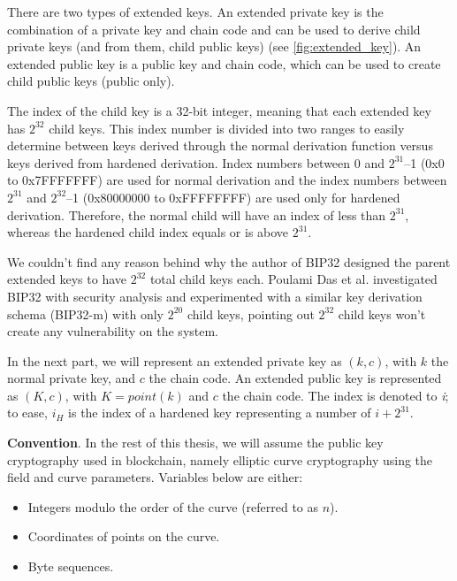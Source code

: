 There are two types of extended keys. An extended private key is the combination of a private key and chain code and can be used to derive child private keys (and from them, child public keys) (see \autoref{fig:extended_key}). An extended public key is a public key and chain code, which can be used to create child public keys (public only).

The index of the child key is a 32-bit integer, meaning that each extended key has $2^{32}$ child keys. This index number is divided into two ranges to easily determine between keys derived through the normal derivation function versus keys derived from hardened derivation. Index numbers between 0 and $2^{31}$–1 (0x0 to 0x7FFFFFFF) are used for normal derivation and the index numbers between $2^{31}$ and $2^{32}$–1 (0x80000000 to 0xFFFFFFFF) are used only for hardened derivation. Therefore, the normal child will have an index of less than $2^{31}$, whereas the hardened child index equals or is above  $2^{31}$.

We couldn’t find any reason behind why the author of BIP32 designed the parent extended keys to have $2^{32}$ total child keys each. Poulami Das et al. \cite{DBLP:conf/ccs/0003EFL021} investigated BIP32 with security analysis and experimented with a similar key derivation schema (BIP32-m) with only $2^{20}$ child keys, pointing out $2^{32}$ child keys won’t create any vulnerability on the system.

In the next part, we will represent an extended private key as $(k, c)$, with $k$ the normal private key, and $c$ the chain code. An extended public key is represented as $(K, c)$, with $K = point(k)$ and $c$ the chain code. The index is denoted to \textit{i}; to ease, $i_H$ is the index of a hardened key representing a number of $i+2^{31}$.

\bigskip
{\textbf{Convention}}. In the rest of this thesis, we will assume the public key cryptography used in blockchain, namely elliptic curve cryptography using the field and curve parameters. Variables below are either:

\begin{itemize}
    \item Integers modulo the order of the curve (referred to as $n$).

    \item Coordinates of points on the curve.

    \item Byte sequences.
\end{itemize}

